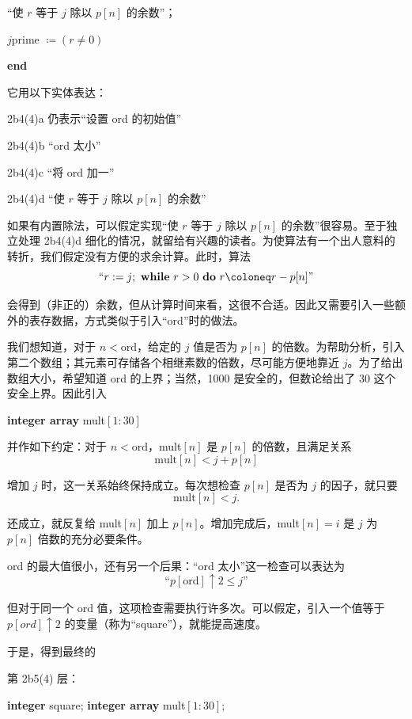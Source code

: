 \documentclass[twoside,11pt,fontset=none]{ctexbook}
\begin{document}
\noindent
\quad “使 $r$ 等于 $j$ 除以 $p[n]$ 的余数”；

\noindent
\quad $j$prime $\coloneq (r \neq 0)$

\noindent
\textbf{end}

\noindent
它用以下实体表达：

\noindent
2b4(4)a\tabto{5em} 仍表示“设置 ord 的初始值”

\noindent
2b4(4)b\tabto{5em} “ord 太小”

\noindent
2b4(4)c\tabto{5em} “将 ord 加一”

\noindent
2b4(4)d\tabto{5em} “使 $r$ 等于 $j$ 除以 $p[n]$ 的余数”

如果有内置除法，可以假定实现“使 $r$ 等于 $j$ 除以 $p[n]$ 的余数”很容易。至于独立处理 2b4(4)d 细化的情况，就留给有兴趣的读者。为使算法有一个出人意料的转折，我们假定没有方便的求余计算。此时，算法
$$
\text{``}r: = j;\text{ \textbf{while} } r > 0\text{ \textbf{do} } r \coloneq r - p[n]\text{''}
$$

\noindent
会得到（非正的）余数，但从计算时间来看，这很不合适。因此又需要引入一些额外的表存数据，方式类似于引入“ord”时的做法。

我们想知道，对于 $n < \text{ord}$，给定的 $j$ 值是否为 $p[n]$ 的倍数。为帮助分析，引入第二个数组；其元素可存储各个相继素数的倍数，尽可能方便地靠近 $j$。为了给出数组大小，希望知道 ord 的上界；当然，1000 是安全的，但数论给出了 30 这个安全上界。因此引入

\noindent
\textbf{integer array} mult$[1 : 30]$

\noindent
并作如下约定：对于 $n < \text{ord}$，mult$[n]$ 是 $p[n]$ 的倍数，且满足关系
$$
\text{mult}[n] < j + p[n]
$$

\noindent
增加 $j$ 时，这一关系始终保持成立。每次想检查 $p[n]$ 是否为 $j$ 的因子，就只要
$$
\text{mult}[n] < j.
$$

\noindent
还成立，就反复给 mult$[n]$ 加上 $p[n]$。增加完成后，mult$[n] = i$ 是 $j$ 为 $p[n]$ 倍数的充分必要条件。

ord 的最大值很小，还有另一个后果：“ord 太小”这一检查可以表达为
$$
\text{``}p[\text{ord}] \uparrow 2 \leqslant j\text{''}
$$

\noindent
但对于同一个 ord 值，这项检查需要执行许多次。可以假定，引入一个值等于 $p[ord] \uparrow 2$ 的变量（称为“square”），就能提高速度。

于是，得到最终的

\noindent
第 2b5(4) 层：

\noindent
\textbf{integer} square; \textbf{integer array} mult$[1 : 30]$;
\end{document}
